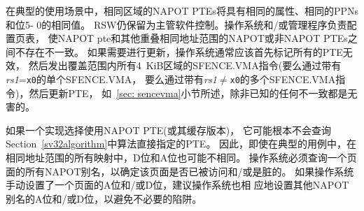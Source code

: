 \begin{commentary}
  在典型的使用场景中，相同区域的NAPOT PTEs将具有相同的属性、相同的PPNs和位5- 0的相同值。
  RSW仍保留为主管软件控制。操作系统和/或管理程序负责配置页表，
  使NAPOT pte和其他重叠相同地址范围的NAPOT或非NAPOT PTEs之间不存在不一致。
  如果需要进行更新，操作系统通常应该首先标记所有的PTE无效，
  然后发出覆盖范围内所有4~KiB区域的SFENCE.VMA指令(要么通过带有{\em rs1}={\tt x0}的单个SFENCE.VMA，
  要么通过带有{\em rs1}$\neq${\tt x0}的多个SFENCE.VMA指令)，然后更新PTE，
  如~\ref{sec: sencevma}小节所述，除非已知的任何不一致都是无害的。

  如果一个实现选择使用NAPOT PTE(或其缓存版本)，
  它可能根本不会查询Section~\ref{sv32algorithm}中算法直接指定的PTE。
  因此，即使在典型的用例中，在相同地址范围的所有映射中，D位和A位也可能不相同。
  操作系统必须查询一个页面的所有NAPOT别名，以确定该页面是否已被访问和/或是脏的。
  如果操作系统手动设置了一个页面的A位和/或D位，建议操作系统也相
  应地设置其他NAPOT别名的A位和/或D位，以避免不必要的陷阱。


\end{commentary}
